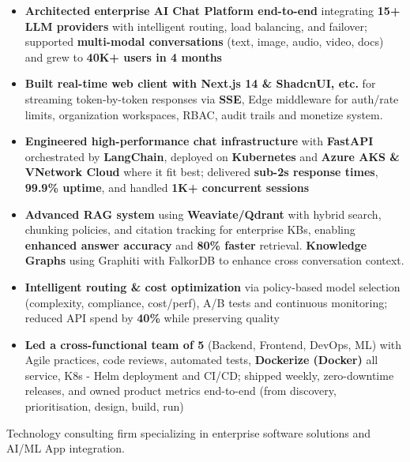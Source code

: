 \documentclass[10pt,a4paper,ragged2e,withhyper]{altacv}
\begin{document}
\medskip

\begin{itemize}
  \item \textbf{Architected enterprise AI Chat Platform end-to-end} integrating \textbf{15+ LLM providers} with intelligent routing, load balancing, and failover; supported \textbf{multi-modal conversations} (text, image, audio, video, docs) and grew to \textbf{40K+ users in 4 months}

  \item \textbf{Built real-time web client with Next.js 14 \& ShadcnUI, etc.} for streaming token-by-token responses via \textbf{SSE}, Edge middleware for auth/rate limits, organization workspaces, RBAC, audit trails and monetize system.

  \item \textbf{Engineered high-performance chat infrastructure} with \textbf{FastAPI} orchestrated by \textbf{LangChain}, deployed on \textbf{Kubernetes} and \textbf{Azure AKS \& VNetwork Cloud} where it fit best; delivered \textbf{sub-2s response times}, \textbf{99.9\% uptime}, and handled \textbf{1K+ concurrent sessions}

  \item \textbf{Advanced RAG system} using \textbf{Weaviate/Qdrant} with hybrid search, chunking policies, and citation tracking for enterprise KBs, enabling \textbf{enhanced answer accuracy} and \textbf{80\% faster} retrieval. \textbf{Knowledge Graphs} using Graphiti with FalkorDB to enhance cross conversation context.

  \item \textbf{Intelligent routing \& cost optimization} via policy-based model selection (complexity, compliance, cost/perf), A/B tests and continuous monitoring; reduced API spend by \textbf{40\%} while preserving quality

  \item \textbf{Led a cross-functional team of 5} (Backend, Frontend, DevOps, ML) with Agile practices, code reviews, automated tests, \textbf{Dockerize (Docker)} all service, K8s - Helm deployment and CI/CD; shipped weekly, zero-downtime releases, and owned product metrics end-to-end (from discovery, prioritisation, design, build, run)
\end{itemize}

\divider


\begin{minipage}{\linewidth}
\justifying
Technology consulting firm specializing in enterprise software solutions and AI/ML App integration.
\end{minipage}
\end{document}
